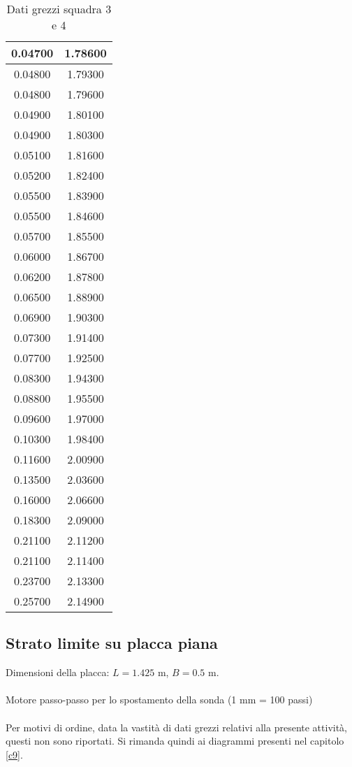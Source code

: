 \begin{table}[H]
\begin{tabular}{|c|c|}
    0.04700         & 1.78600      \\ \hline
    0.04800         & 1.79300      \\ \hline
    0.04800         & 1.79600      \\ \hline
    0.04900         & 1.80100      \\ \hline
    0.04900         & 1.80300      \\ \hline
    0.05100         & 1.81600      \\ \hline
    0.05200         & 1.82400      \\ \hline
    0.05500         & 1.83900      \\ \hline
    0.05500         & 1.84600      \\ \hline
    0.05700         & 1.85500      \\ \hline
    0.06000         & 1.86700      \\ \hline
    0.06200         & 1.87800      \\ \hline
    0.06500         & 1.88900      \\ \hline
    0.06900         & 1.90300      \\ \hline
    0.07300         & 1.91400      \\ \hline
    0.07700         & 1.92500      \\ \hline
    0.08300         & 1.94300      \\ \hline
    0.08800         & 1.95500      \\ \hline
    0.09600         & 1.97000      \\ \hline
    0.10300         & 1.98400      \\ \hline
    0.11600         & 2.00900      \\ \hline
    0.13500         & 2.03600      \\ \hline
    0.16000         & 2.06600      \\ \hline
    0.18300         & 2.09000      \\ \hline
    0.21100         & 2.11200      \\ \hline
    0.21100         & 2.11400      \\ \hline
    0.23700         & 2.13300      \\ \hline
    0.25700         & 2.14900      \\ \hline
    \end{tabular}
    \caption{Dati grezzi squadra 3 e 4}
\end{table}

\subsection{Strato limite su placca piana}\label{a9}
Dimensioni della placca: $L=1.425$ m, $B=0.5$ m.\\\\
Motore passo-passo per lo spostamento della sonda (1 mm = 100 passi)\\\\
Per motivi di ordine, data la vastità di dati grezzi relativi alla presente attività, questi non sono riportati. Si rimanda quindi ai diagrammi presenti nel capitolo \ref{c9}.

